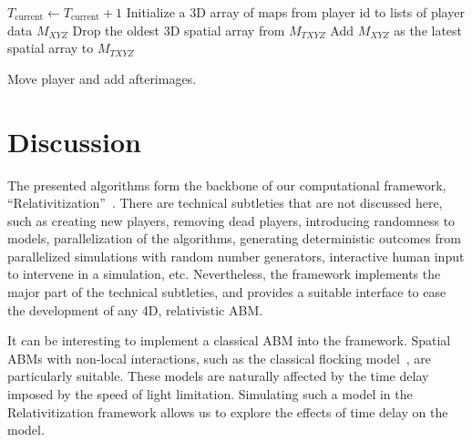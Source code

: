 \documentclass{svproc}
\begin{document}
\begin{algorithm}

$T_{\textrm{current}} \gets T_{\textrm{current}} + 1$\;
Initialize a 3D array of maps from player id to lists of player data $M_{XYZ}$\;
Drop the oldest 3D spatial array from $M_{TXYZ}$\;
Add $M_{XYZ}$ as the latest spatial array to $M_{TXYZ}$\;

\caption{Move player and add afterimages.}
\label{alg:move}
\end{algorithm}

\section{Discussion}

The presented algorithms form the backbone of our computational framework, 
``Relativitization''~\cite{relativitization}.
There are technical subtleties that are not discussed here,
such as creating new players, removing dead players,
introducing randomness to models, parallelization of the algorithms, 
generating deterministic outcomes from parallelized simulations with random number generators,
interactive human input to intervene in a simulation, etc.
Nevertheless, the framework implements the major part of the technical subtleties, 
and provides a suitable interface to ease the development of any 4D, relativistic ABM.

It can be interesting to implement a classical ABM into the framework. 
Spatial ABMs with non-local interactions, 
such as the classical flocking model~\cite{reynolds1987flocks},
are particularly suitable.
These models are naturally affected by the time delay
imposed by the speed of light limitation.
Simulating such a model in the Relativitization framework allows us to explore the effects of time delay on the model.
\end{document}
